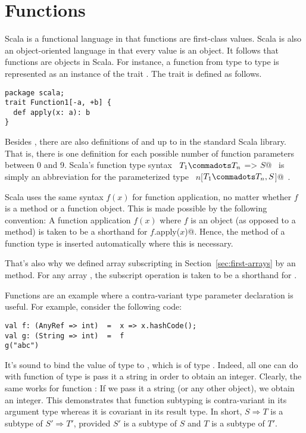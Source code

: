 \section{Functions}\label{sec:functions}

Scala is a functional language in that functions are first-class
values.  Scala is also an object-oriented language in that every value
is an object.  It follows that functions are objects in Scala.  For
instance, a function from type  to type  is
represented as an instance of the trait .
The  trait is defined as follows.
\begin{lstlisting}
package scala;
trait Function1[-a, +b] {
  def apply(x: a): b
}
\end{lstlisting}
Besides , there are also definitions of
 and  up to  in the
standard Scala library. That is, there is one definition for each
possible number of function parameters between 0 and 9.  Scala's
function type syntax ~\lstinline@$T_1 \commadots T_n$ => $S$@~ is
simply an abbreviation for the parameterized type
~\lstinline@Function$n$[$T_1 \commadots T_n, S$]@~.

Scala uses the same syntax $f(x)$ for function application, no matter
whether $f$ is a method or a function object. This is made possible by
the following convention: A function application $f(x)$ where $f$ is
an object (as opposed to a method) is taken to be a shorthand for
\lstinline@$f$.apply($x$)@. Hence, the  method of a
function type is inserted automatically where this is necessary.

That's also why we defined array subscripting in
Section~\ref{sec:first-arrays} by an  method.  For any
array , the subscript operation  is taken to be a
shorthand for .

Functions are an example where a contra-variant type parameter
declaration is useful. For example, consider the following code:
\begin{lstlisting} 
val f: (AnyRef => int)  =  x => x.hashCode();
val g: (String => int)  =  f
g("abc")
\end{lstlisting}
It's sound to bind the value  of type  to
, which is of type . Indeed, all one can
do with function of type  is pass it a string in
order to obtain an integer. Clearly, the same works for function
: If we pass it a string (or any other object), we obtain an
integer.  This demonstrates that function subtyping is contra-variant
in its argument type whereas it is covariant in its result type.
In short, $S \Rightarrow T$ is a subtype of $S' \Rightarrow T'$, provided
$S'$ is a subtype of $S$ and $T$ is a subtype of $T'$.

